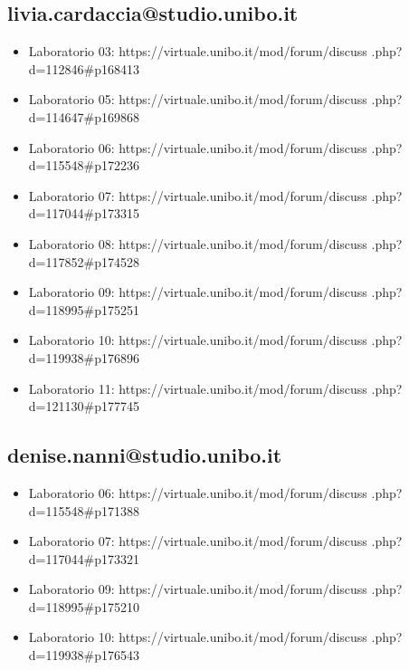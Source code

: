 \documentclass{article}
\begin{document}
\subsection{livia.cardaccia@studio.unibo.it}
\begin{itemize}
    \item Laboratorio 03: https://virtuale.unibo.it/mod/forum/discuss
    .php?d=112846\#p168413
    \item Laboratorio 05: https://virtuale.unibo.it/mod/forum/discuss
    .php?d=114647\#p169868
    \item Laboratorio 06: https://virtuale.unibo.it/mod/forum/discuss
    .php?d=115548\#p172236
    \item Laboratorio 07: https://virtuale.unibo.it/mod/forum/discuss
    .php?d=117044\#p173315
    \item Laboratorio 08: https://virtuale.unibo.it/mod/forum/discuss
    .php?d=117852\#p174528
    \item Laboratorio 09: https://virtuale.unibo.it/mod/forum/discuss
    .php?d=118995\#p175251
    \item Laboratorio 10:
    https://virtuale.unibo.it/mod/forum/discuss
    .php?d=119938\#p176896
    \item Laboratorio 11: https://virtuale.unibo.it/mod/forum/discuss
    .php?d=121130\#p177745  
\end{itemize}
\subsection{denise.nanni@studio.unibo.it}
\begin{itemize}
    \item Laboratorio 06: https://virtuale.unibo.it/mod/forum/discuss
    .php?d=115548\#p171388
    \item Laboratorio 07: https://virtuale.unibo.it/mod/forum/discuss
    .php?d=117044\#p173321
    \item Laboratorio 09: https://virtuale.unibo.it/mod/forum/discuss
    .php?d=118995\#p175210
    \item Laboratorio 10: https://virtuale.unibo.it/mod/forum/discuss
    .php?d=119938\#p176543
\end{itemize}
\end{document}
